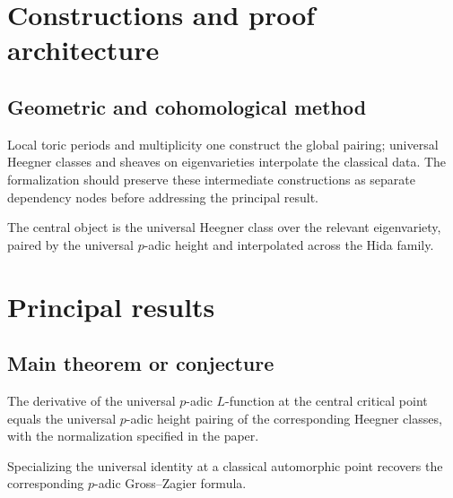\chapter{Constructions and proof architecture}
\label{chap:universal-p-adic-gross-zagier-formula-method}

\section{Geometric and cohomological method}
\label{sec:universal-p-adic-gross-zagier-formula-method}

Local toric periods and multiplicity one construct the global pairing; universal Heegner classes and sheaves on eigenvarieties interpolate the classical data. The formalization should preserve these intermediate constructions
as separate dependency nodes before addressing the principal result.

\begin{definition}
\label{universal-p-adic-gross-zagier-formula-central-object}
The central object is the universal Heegner class over the relevant eigenvariety, paired by the universal $p$-adic height and interpolated across the Hida family.
\notready
\end{definition}

\chapter{Principal results}
\label{chap:universal-p-adic-gross-zagier-formula-results}

\section{Main theorem or conjecture}
\label{sec:universal-p-adic-gross-zagier-formula-results}

\begin{theorem}
\label{universal-p-adic-gross-zagier-formula-main}
The derivative of the universal $p$-adic $L$-function at the central critical point equals the universal $p$-adic height pairing of the corresponding Heegner classes, with the normalization specified in the paper.
\notready
\end{theorem}

\begin{corollary}
\label{universal-p-adic-gross-zagier-formula-secondary}
Specializing the universal identity at a classical automorphic point recovers the corresponding $p$-adic Gross--Zagier formula.
\notready
\end{corollary}
